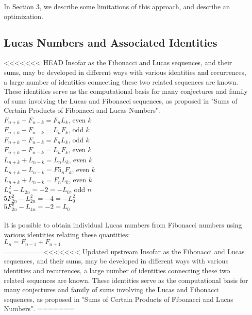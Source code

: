 \documentclass[11pt]{article}
\begin{document}
In Section 3, we describe some limitations of this approach, and describe an optimization.

\subsection{Lucas Numbers and Associated Identities}
<<<<<<< HEAD
Insofar as the Fibonacci and Lucas sequences, and their sums, may be developed in different ways with various identities and recurrences, a large number of identities connecting these two related sequences are known. These identities serve as the computational basis for many conjectures and family of sums involving the Lucas and Fibonacci sequences, as proposed in "Sums of Certain Products of Fibonacci and Lucas Numbers". \\
$F_{n+k} + F_{n-k} = F_{n}L_{k}$, even $k$\\
$F_{n+k} + F_{n-k} = L_{n}F_{k}$, odd $k$\\$F_{n+k} - F_{n-k} = F_{n}L_{k}$, odd $k$ \\ $F_{n+k} - F_{n-k} = L_{n}F_{k}$, even $k$ \\ $L_{n+k} + L_{n-k} = L_{n}L_{k}$, even $k$ \\ $L_{n+k} - L_{n-k}= F5_{n}F_{k}$, even $k$ \\ $L_{n+k} + L_{n-k} = F_{n}L_{k}$, even $k$\\ $L_{n}^{2} - L_{2n} = -2 = -L_{0}$, odd $n$\\ $5F_{2n}^{2} - L_{2n}^{2} = -4 = -L_{0}^{2}$\\ $5F_{2n}^{2} - L_{4n} = -2 = L_{0}$\\\\  It is possible to obtain individual Lucas numbers from Fibonacci numbers using various identities relating these quantities:\\$L_{n} = F_{n-1} + F_{n+1}$ \\ 
=======
<<<<<<< Updated upstream
Insofar as the Fibonacci and Lucas sequences, and their sums, may be developed in different ways with various identities and recurrences, a large number of identities connecting these two related sequences are known. These identities serve as the computational basis for many conjectures and family of sums involving the Lucas and Fibonacci sequences, as proposed in "Sums of Certain Products of Fibonacci and Lucas Numbers". 
=======
\end{document}

